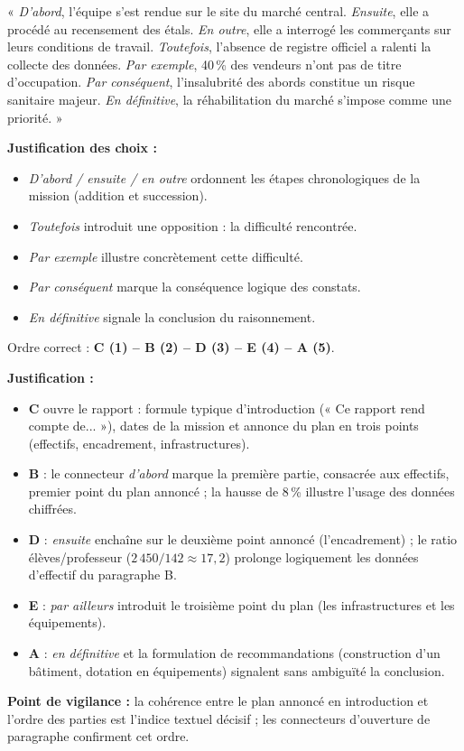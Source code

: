 \documentclass[11pt]{article}
\begin{document}
\begin{corrige}
« \emph{D'abord}, l'équipe s'est rendue sur le site du marché central. \emph{Ensuite}, elle a procédé au recensement des étals. \emph{En outre}, elle a interrogé les commerçants sur leurs conditions de travail. \emph{Toutefois}, l'absence de registre officiel a ralenti la collecte des données. \emph{Par exemple}, 40\,\% des vendeurs n'ont pas de titre d'occupation. \emph{Par conséquent}, l'insalubrité des abords constitue un risque sanitaire majeur. \emph{En définitive}, la réhabilitation du marché s'impose comme une priorité. »

\textbf{Justification des choix :}
\begin{itemize}
    \item \emph{D'abord / ensuite / en outre} ordonnent les étapes chronologiques de la mission (addition et succession).
    \item \emph{Toutefois} introduit une opposition : la difficulté rencontrée.
    \item \emph{Par exemple} illustre concrètement cette difficulté.
    \item \emph{Par conséquent} marque la conséquence logique des constats.
    \item \emph{En définitive} signale la conclusion du raisonnement.
\end{itemize}
\end{corrige}

\begin{corrige}
Ordre correct : \textbf{C (1) -- B (2) -- D (3) -- E (4) -- A (5)}.

\textbf{Justification :}
\begin{itemize}
    \item \textbf{C} ouvre le rapport : formule typique d'introduction (« Ce rapport rend compte de... »), dates de la mission et annonce du plan en trois points (effectifs, encadrement, infrastructures).
    \item \textbf{B} : le connecteur \emph{d'abord} marque la première partie, consacrée aux effectifs, premier point du plan annoncé ; la hausse de 8\,\% illustre l'usage des données chiffrées.
    \item \textbf{D} : \emph{ensuite} enchaîne sur le deuxième point annoncé (l'encadrement) ; le ratio élèves/professeur ($2\,450 / 142 \approx 17{,}2$) prolonge logiquement les données d'effectif du paragraphe B.
    \item \textbf{E} : \emph{par ailleurs} introduit le troisième point du plan (les infrastructures et les équipements).
    \item \textbf{A} : \emph{en définitive} et la formulation de recommandations (construction d'un bâtiment, dotation en équipements) signalent sans ambiguïté la conclusion.
\end{itemize}
\textbf{Point de vigilance :} la cohérence entre le plan annoncé en introduction et l'ordre des parties est l'indice textuel décisif ; les connecteurs d'ouverture de paragraphe confirment cet ordre.
\end{corrige}
\end{document}
